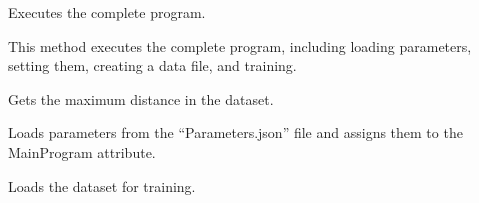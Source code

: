 \documentclass[letterpaper,10pt,english]{sphinxmanual}
\begin{document}
\begin{fulllineitems}
\begin{fulllineitems}
\label{\detokenize{MainProgram:MainProgram.MainProgram.execute}}
\pysigstartsignatures
{}
\pysigstopsignatures
\sphinxAtStartPar
Executes the complete program.
\begin{description}
\sphinxAtStartPar
This method executes the complete program, including loading parameters, setting them, creating a data file,
and training.

\end{description}

\end{fulllineitems}


\begin{fulllineitems}
\label{\detokenize{MainProgram:MainProgram.MainProgram.get_max_distance}}
\pysigstartsignatures
{}
\pysigstopsignatures
\sphinxAtStartPar
Gets the maximum distance in the dataset.

\end{fulllineitems}


\begin{fulllineitems}
\label{\detokenize{MainProgram:MainProgram.MainProgram.get_parameters_from_json}}
\pysigstartsignatures
{}
\pysigstopsignatures
\sphinxAtStartPar
Loads parameters from the “Parameters.json” file and assigns them to the MainProgram  attribute.

\end{fulllineitems}


\begin{fulllineitems}
\label{\detokenize{MainProgram:MainProgram.MainProgram.load_dataset}}
\pysigstartsignatures
{}
\pysigstopsignatures
\sphinxAtStartPar
Loads the dataset for training.


\end{fulllineitems}
\end{fulllineitems}
\end{document}
